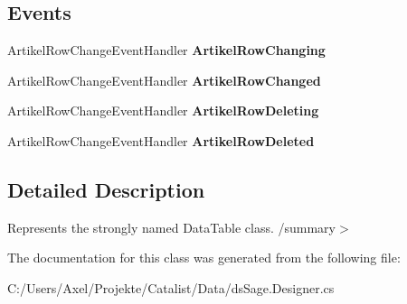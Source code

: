 \subsection*{Events}
\begin{DoxyCompactItemize}
\item 
Artikel\+Row\+Change\+Event\+Handler {\bfseries Artikel\+Row\+Changing}\hypertarget{class_products_1_1_data_1_1ds_sage_1_1_artikel_data_table_a415191f2b07bb9224213949d3294fac8}{}\label{class_products_1_1_data_1_1ds_sage_1_1_artikel_data_table_a415191f2b07bb9224213949d3294fac8}

\item 
Artikel\+Row\+Change\+Event\+Handler {\bfseries Artikel\+Row\+Changed}\hypertarget{class_products_1_1_data_1_1ds_sage_1_1_artikel_data_table_afbb622edcbd3d789d3ddedc640c02a58}{}\label{class_products_1_1_data_1_1ds_sage_1_1_artikel_data_table_afbb622edcbd3d789d3ddedc640c02a58}

\item 
Artikel\+Row\+Change\+Event\+Handler {\bfseries Artikel\+Row\+Deleting}\hypertarget{class_products_1_1_data_1_1ds_sage_1_1_artikel_data_table_af8b192e7a9ff7308fe922e09de24b568}{}\label{class_products_1_1_data_1_1ds_sage_1_1_artikel_data_table_af8b192e7a9ff7308fe922e09de24b568}

\item 
Artikel\+Row\+Change\+Event\+Handler {\bfseries Artikel\+Row\+Deleted}\hypertarget{class_products_1_1_data_1_1ds_sage_1_1_artikel_data_table_a5e6fe01a6ab690c88c8105829beacf78}{}\label{class_products_1_1_data_1_1ds_sage_1_1_artikel_data_table_a5e6fe01a6ab690c88c8105829beacf78}

\end{DoxyCompactItemize}


\subsection{Detailed Description}
Represents the strongly named Data\+Table class. /summary$>$ 

The documentation for this class was generated from the following file\+:\begin{DoxyCompactItemize}
\item 
C\+:/\+Users/\+Axel/\+Projekte/\+Catalist/\+Data/ds\+Sage.\+Designer.\+cs\end{DoxyCompactItemize}

